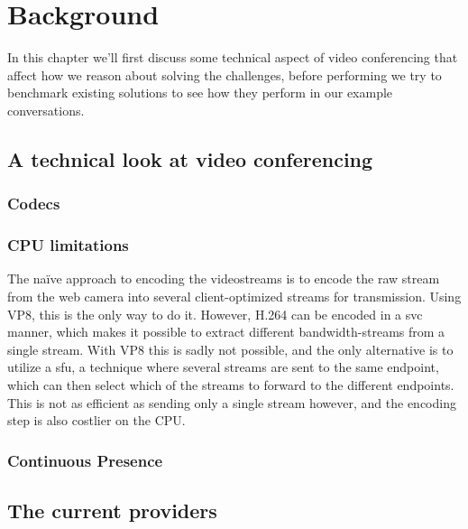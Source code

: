 \chapter{Background}
\label{chp:background}

In this chapter we'll first discuss some technical aspect of video conferencing that affect how we reason about solving the challenges, before performing we try to benchmark existing solutions to see how they perform in our example conversations.


\section{A technical look at video conferencing}

\subsection{Codecs}


\subsection{CPU limitations}

The naïve approach to encoding the videostreams is to encode the raw stream from the web camera into several client-optimized streams for transmission. Using VP8, this is the only way to do it. However, H.264 can be encoded in a \gls{svc} manner, which makes it possible to extract different bandwidth-streams from a single stream. With VP8 this is sadly not possible, and the only alternative is to utilize a \gls{sfu}, a technique where several streams are sent to the same endpoint, which can then select which of the streams to forward to the different endpoints. This is not as efficient as sending only a single stream however, and the encoding step is also costlier on the CPU.

\subsection{Continuous Presence}



\section{The current providers}

